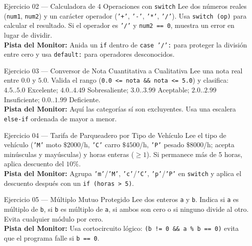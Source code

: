 \documentclass[11pt,letterpaper]{article}
\begin{document}
\begin{ejercicio}{Ejercicio 02 --- Calculadora de 4 Operaciones con \texttt{switch}}
Lee dos números reales (\texttt{num1}, \texttt{num2}) y un carácter operador (\texttt{'+'}, \texttt{'-'}, \texttt{'*'}, \texttt{'/'}). Usa \texttt{switch (op)} para calcular el resultado. Si el operador es \texttt{'/'} y \texttt{num2 == 0}, muestra un error en lugar de dividir.\\
\textbf{Pista del Monitor:} Anida un \texttt{if} dentro de \texttt{case '/':} para proteger la división entre cero y usa \texttt{default:} para operadores desconocidos.
\end{ejercicio}

\begin{ejercicio}{Ejercicio 03 --- Conversor de Nota Cuantitativa a Cualitativa}
Lee una nota real entre $0.0$ y $5.0$. Valida el rango (\texttt{0.0 <= nota \&\& nota <= 5.0}) y clasifica: $4.5..5.0$ Excelente; $4.0..4.49$ Sobresaliente; $3.0..3.99$ Aceptable; $2.0..2.99$ Insuficiente; $0.0..1.99$ Deficiente.\\
\textbf{Pista del Monitor:} Aquí las categorías sí son excluyentes. Usa una escalera \texttt{else-if} ordenada de mayor a menor.
\end{ejercicio}

\begin{ejercicio}{Ejercicio 04 --- Tarifa de Parqueadero por Tipo de Vehículo}
Lee el tipo de vehículo (\texttt{'M'} moto $\$2000$/h, \texttt{'C'} carro $\$4500$/h, \texttt{'P'} pesado $\$8000$/h; acepta minúsculas y mayúsculas) y horas enteras ($\ge 1$). Si permanece más de 5 horas, aplica descuento del $10\%$.\\
\textbf{Pista del Monitor:} Agrupa \texttt{'m'}/\texttt{'M'}, \texttt{'c'}/\texttt{'C'}, \texttt{'p'}/\texttt{'P'} en \texttt{switch} y aplica el descuento después con un \texttt{if (horas > 5)}.
\end{ejercicio}

\begin{ejercicio}{Ejercicio 05 --- Múltiplo Mutuo Protegido}
Lee dos enteros \texttt{a} y \texttt{b}. Indica si \texttt{a} es múltiplo de \texttt{b}, si \texttt{b} es múltiplo de \texttt{a}, si ambos son cero o si ninguno divide al otro. Evita cualquier módulo por cero.\\
\textbf{Pista del Monitor:} Usa cortocircuito lógico: \texttt{(b != 0 \&\& a \% b == 0)} evita que el programa falle si \texttt{b == 0}.
\end{ejercicio}
\end{document}
